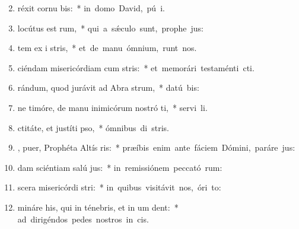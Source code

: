 \begin{flushleft}
\begin{enumerate}[leftmargin=*]
\setcounter{enumi}{1}

\item {}réxit cornu  bis:~* \mbox{in domo David, pú i.}
\item {} locútus est   rum,~* \mbox{qui a s\'{\ae}culo sunt, prophe jus:}
\item {}tem ex i stris,~* \mbox{et de manu ómnium,  runt nos.}
\item {}ciéndam misericórdiam cum  stris:~* \mbox{et memorári testaménti  cti.}
\item {}rándum, quod jurávit ad Abra  strum,~* \mbox{datú  bis:}
\item {}ne timóre, de manu inimicórum nostró ti,~* \mbox{servi li.}
\item {}ctitáte, et justíti  pso,~* \mbox{ómnibus di stris.}
\item {}, puer, Prophéta Altís ris:~* \mbox{præíbis enim ante fáciem Dómini, paráre  jus:}
\item {}dam sciéntiam salú  jus:~* \mbox{in remissiónem peccató rum:}
\item {}scera misericórdi  stri:~* \mbox{in quibus visitávit nos, óri  to:}
\item {}mináre his, qui in ténebris, et in um  dent:~* \mbox{ad dirigéndos pedes nostros in  cis.}


\end{enumerate}
\end{flushleft}

